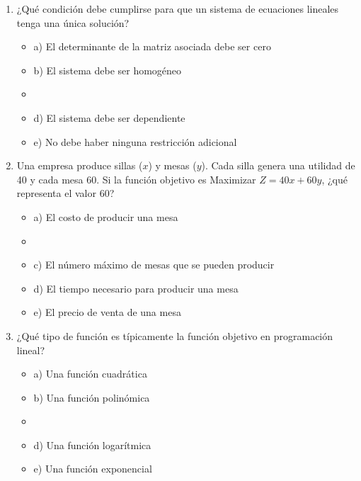 \documentclass[a4paper,10pt]{article}
\begin{document}
\begin{enumerate}
    \item ¿Qué condición debe cumplirse para que un sistema de ecuaciones lineales tenga una única solución?
    \begin{itemize}
        \item a) El determinante de la matriz asociada debe ser cero
        \item b) El sistema debe ser homogéneo
        \item {}
        \item d) El sistema debe ser dependiente
        \item e) No debe haber ninguna restricción adicional
    \end{itemize}

    \item Una empresa produce sillas (\(x\)) y mesas (\(y\)). Cada silla genera una utilidad de 40 y cada mesa 60. Si la función objetivo es Maximizar \(Z = 40x + 60y\), ¿qué representa el valor 60?
    \begin{itemize}
        \item a) El costo de producir una mesa
        \item {}
        \item c) El número máximo de mesas que se pueden producir
        \item d) El tiempo necesario para producir una mesa
        \item e) El precio de venta de una mesa
    \end{itemize}

    \item ¿Qué tipo de función es típicamente la función objetivo en programación lineal?
    \begin{itemize}
        \item a) Una función cuadrática
        \item b) Una función polinómica
        \item {}
        \item d) Una función logarítmica
        \item e) Una función exponencial
    \end{itemize}


\end{enumerate}
\end{document}
